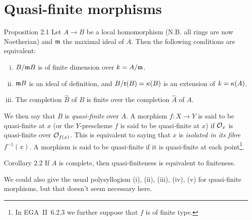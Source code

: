 \section{Quasi-finite morphisms}
\label{I.2}

\begin{itenv}{Proposition 2.1}
\label{I.2.1}
  Let $A\to B$ be a local homomorphism (N.B. all rings are now Noetherian) and $\frak{m}$ the maximal ideal of $A$.
  Then the following conditions are equivalent:
  \begin{enumerate}[(i)]
    \item $B/\frak{m}B$ is of finite dimension over $k=A/\frak{m}$.
    \item $\frak{m}B$ is an ideal of definition, and $B/\frak{r}(B)=\kres(B)$ is an extension of $k=\kres(A)$.
    \item The completion $\hat{B}$ of $B$ is finite over the completion $\hat{A}$ of $A$.
  \end{enumerate}
\end{itenv}

We then say that $B$ is \emph{quasi-finite} over $A$.
A morphism $f\colon X\to Y$ is said to be quasi-finite at $x$ (or the $Y$-prescheme $f$ is said to be quasi-finite at $x$) if $\cal{O}_x$ is quasi-finite over $\cal{O}_{f(x)}$.
This is equivalent to saying that $x$ is \emph{isolated in its fibre $f^{-1}(x)$}.
A morphism is said to be quasi-finite if it is quasi-finite at each point\footnote{In EGA~II~6.2.3 we further suppose that $f$ is of finite type.}.

\begin{itenv}{Corollary 2.2}
\label{I.2.2}
  If $A$ is complete, then quasi-finiteness is equivalent to finiteness.
\end{itenv}

We could also give the usual polysyllogism (i), (ii), (iii), (iv), (v) for quasi-finite morphisms, but that doesn't seem necessary here.
